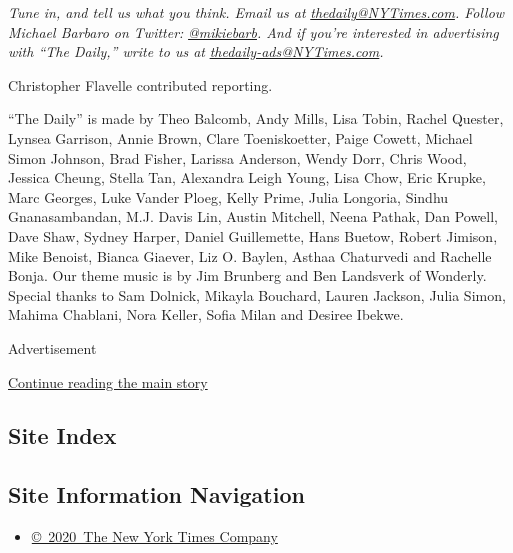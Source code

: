 \emph{Tune in, and tell us what you think. Email us at}
\href{mailto:thedaily@NYTimes.com}{\emph{thedaily@NYTimes.com}}\emph{.
Follow Michael Barbaro on Twitter:}
\href{https://twitter.com/mikiebarb}{\emph{@mikiebarb}}\emph{. And if
you're interested in advertising with ``The Daily,'' write to us at}
\href{mailto:thedaily-ads@NYTimes.com}{\emph{thedaily-ads@NYTimes.com}}\emph{.}

Christopher Flavelle contributed reporting.

``The Daily'' is made by Theo Balcomb, Andy Mills, Lisa Tobin, Rachel
Quester, Lynsea Garrison, Annie Brown, Clare Toeniskoetter, Paige
Cowett, Michael Simon Johnson, Brad Fisher, Larissa Anderson, Wendy
Dorr, Chris Wood, Jessica Cheung, Stella Tan, Alexandra Leigh Young,
Lisa Chow, Eric Krupke, Marc Georges, Luke Vander Ploeg, Kelly Prime,
Julia Longoria, Sindhu Gnanasambandan, M.J. Davis Lin, Austin Mitchell,
Neena Pathak, Dan Powell, Dave Shaw, Sydney Harper, Daniel Guillemette,
Hans Buetow, Robert Jimison, Mike Benoist, Bianca Giaever, Liz O.
Baylen, Asthaa Chaturvedi and Rachelle Bonja. Our theme music is by Jim
Brunberg and Ben Landsverk of Wonderly. Special thanks to Sam Dolnick,
Mikayla Bouchard, Lauren Jackson, Julia Simon, Mahima Chablani, Nora
Keller, Sofia Milan and Desiree Ibekwe.

Advertisement

\protect\hyperlink{after-bottom}{Continue reading the main story}

\hypertarget{site-index}{%
\subsection{Site Index}\label{site-index}}

\hypertarget{site-information-navigation}{%
\subsection{Site Information
Navigation}\label{site-information-navigation}}

\begin{itemize}
\tightlist
\item
  \href{https://help.nytimes3xbfgragh.onion/hc/en-us/articles/115014792127-Copyright-notice}{©~2020~The
  New York Times Company}
\end{itemize}

